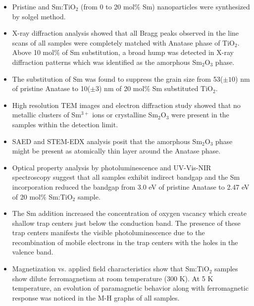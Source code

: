 \documentclass[main.tex]{subfiles}
\begin{document}
\begin{itemize}

	\item Pristine and Sm:TiO$_{2}$ (from 0 to 20 mol$\%$ Sm) nanoparticles were synthesized by solgel method.\\

	\item X-ray diffraction analysis showed that all Bragg peaks observed in the line scans of all samples were completely matched with Anatase phase of TiO$_{2}$. Above 10 mol$\%$ of Sm substitution, a broad hump was detected in X-ray diffraction patterns which was identified as the amorphous Sm$_{2}$O$_{3}$ phase.\\

	\item The substitution of Sm was found to suppress the grain size from 53($\pm10$) nm of pristine Anatase to 10($\pm3$) nm of 20 mol$\%$ Sm substituted TiO$_{2}$.\\

	\item High resolution TEM images and electron diffraction study showed that no metallic clusters of Sm$^{3+}$ ions or crystalline Sm$_{2}$O$_{3}$ were present in the samples within the detection limit.\\

	\item SAED and STEM-EDX analysis posit that the amorphous Sm$_{2}$O$_{3}$ phase might be present as atomically thin layer around the Anatase phase.\\

	 \item Optical property analysis by photoluminescence and UV-Vis-NIR spectroscopy suggest that all samples exhibit indirect bandgap and the Sm incorporation reduced the bandgap from 3.0 eV of pristine Anatase to 2.47 eV of 20 mol$\%$ Sm:TiO$_{2}$ sample.\\

	\item The Sm addition increased the concentration of oxygen vacancy which create shallow trap centers just below the conduction band. The presence of these trap centers manifests the visible photoluminescence due to the recombination of mobile electrons in the trap centers with the holes in the valence band.\\ 

	\item Magnetization vs. applied field characteristics show that Sm:TiO$_{2}$ samples show dilute ferromagnetism at room temperature (300 K). At 5 K temperature, an evolution of paramagnetic behavior along with ferromagnetic response was noticed in the M-H graphs of all samples.\\
	
\end{itemize}
\FloatBarrier



\thispagestyle{fancy}
\end{document}
